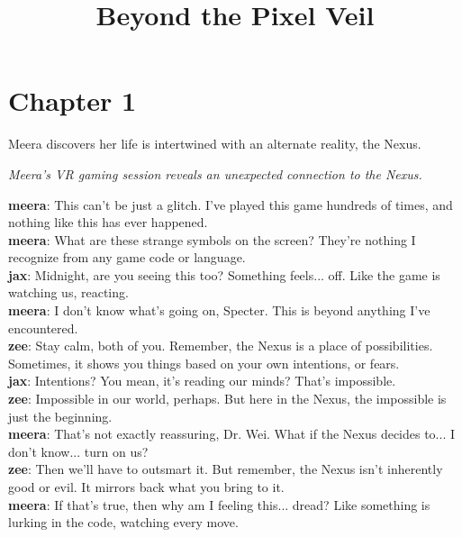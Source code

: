 \documentclass[12pt]{book}
\begin{document}
    \onehalfspacing
    \title{Beyond the Pixel Veil}
\maketitle

\chapter*{Chapter 1}
Meera discovers her life is intertwined with an alternate reality, the Nexus.

\newpage

\textit{Meera's VR gaming session reveals an unexpected connection to the Nexus.}

\textbf{meera}: This can't be just a glitch. I've played this game hundreds of times, and nothing like this has ever happened.\\

\textbf{meera}: What are these strange symbols on the screen? They're nothing I recognize from any game code or language.\\

\textbf{jax}: Midnight, are you seeing this too? Something feels... off. Like the game is watching us, reacting.\\

\textbf{meera}: I don't know what's going on, Specter. This is beyond anything I've encountered.\\

\textbf{zee}: Stay calm, both of you. Remember, the Nexus is a place of possibilities. Sometimes, it shows you things based on your own intentions, or fears.\\

\textbf{jax}: Intentions? You mean, it's reading our minds? That's impossible.\\

\textbf{zee}: Impossible in our world, perhaps. But here in the Nexus, the impossible is just the beginning.\\

\textbf{meera}: That's not exactly reassuring, Dr. Wei. What if the Nexus decides to... I don't know... turn on us?\\

\textbf{zee}: Then we'll have to outsmart it. But remember, the Nexus isn't inherently good or evil. It mirrors back what you bring to it.\\

\textbf{meera}: If that's true, then why am I feeling this... dread? Like something is lurking in the code, watching every move.\\
\end{document}
